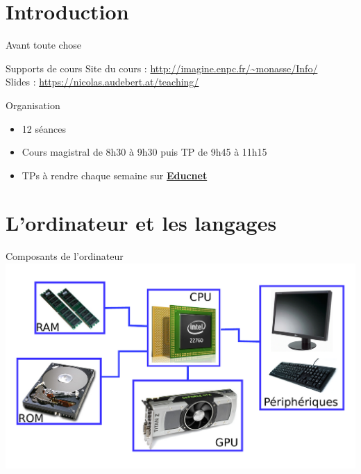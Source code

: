 
\subtitle{Préliminaires}
\date{}
\maketitle

\section{Introduction}

\begin{frame}{Avant toute chose}
  \begin{block}{Supports de cours}
    Site du cours : {\small \url{http://imagine.enpc.fr/~monasse/Info/}}\\
  	Slides : {\small \url{https://nicolas.audebert.at/teaching/}}
  \end{block}

  \begin{block}{Organisation}
    \begin{itemize}
        \item 12 séances
	\item Cours magistral de 8h30 à 9h30 puis TP de 9h45 à 11h15
        \item TPs à rendre chaque semaine sur \href{https://educnet.enpc.fr}{\textbf{Educnet}}
    \end{itemize}
  \end{block}

\end{frame}


\section{L'ordinateur et les langages}

\begin{frame}{Composants de l'ordinateur}
	\centering
	\includegraphics[width=\linewidth]{images/ordi_5.pdf}
\end{frame}

